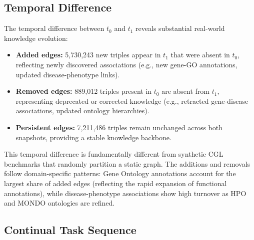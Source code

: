 

\subsection{Temporal Difference}
\label{sec:temporal_diff}

The temporal difference between $t_0$ and $t_1$ reveals substantial real-world knowledge evolution:
\begin{itemize}
    \item \textbf{Added edges:} 5,730,243 new triples appear in $t_1$ that were absent in $t_0$, reflecting newly discovered associations (e.g., new gene-GO annotations, updated disease-phenotype links).
    \item \textbf{Removed edges:} 889,012 triples present in $t_0$ are absent from $t_1$, representing deprecated or corrected knowledge (e.g., retracted gene-disease associations, updated ontology hierarchies).
    \item \textbf{Persistent edges:} 7,211,486 triples remain unchanged across both snapshots, providing a stable knowledge backbone.
\end{itemize}

This temporal difference is fundamentally different from synthetic CGL benchmarks that randomly partition a static graph.
The additions and removals follow domain-specific patterns: Gene Ontology annotations account for the largest share of added edges (reflecting the rapid expansion of functional annotations), while disease-phenotype associations show high turnover as HPO and MONDO ontologies are refined.

\subsection{Continual Task Sequence}
\label{sec:task_sequence}

